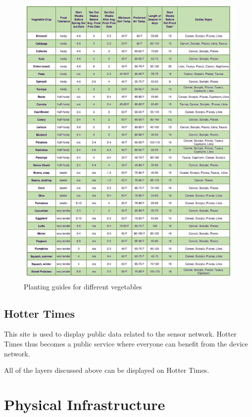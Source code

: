 \documentclass[
]{book}
\begin{document}
\begin{figure}

{\centering \includegraphics{images/crop_temperature_guide} 

}

\caption{Planting guides for different vegetables}\label{fig:unnamed-chunk-6}
\end{figure}

\hypertarget{hotter-times}{%
\section{Hotter Times}\label{hotter-times}}

This site is used to display public data related to the sensor network.
Hotter Times thus becomes a public service where everyone can benefit from
the device network.

All of the layers discussed above can be displayed on Hotter Times.

\hypertarget{physical-infrastructure}{%
\chapter{Physical Infrastructure}\label{physical-infrastructure}}
\end{document}
